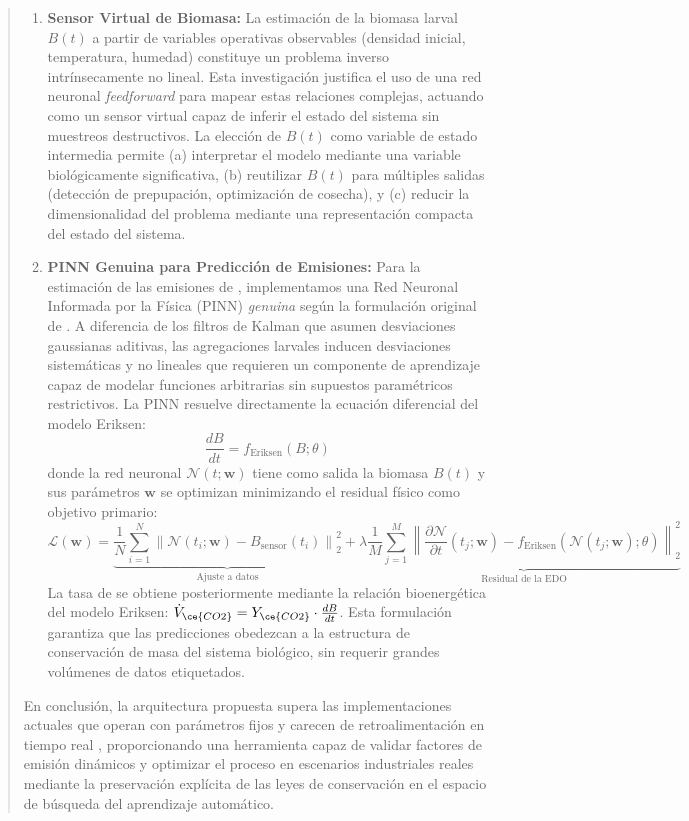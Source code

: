 \documentclass[12pt,oneside]{book}
\begin{document}
\begin{quote}
\begin{enumerate}
    \item \textbf{Sensor Virtual de Biomasa:} La estimación de la biomasa larval $B(t)$ a partir de variables operativas observables (densidad inicial, temperatura, humedad) constituye un problema inverso intrínsecamente no lineal. Esta investigación justifica el uso de una red neuronal \textit{feedforward} para mapear estas relaciones complejas, actuando como un sensor virtual capaz de inferir el estado del sistema sin muestreos destructivos. La elección de $B(t)$ como variable de estado intermedia permite (a) interpretar el modelo mediante una variable biológicamente significativa, (b) reutilizar $B(t)$ para múltiples salidas (detección de prepupación, optimización de cosecha), y (c) reducir la dimensionalidad del problema mediante una representación compacta del estado del sistema.
    
    \item \textbf{PINN Genuina para Predicción de Emisiones:} Para la estimación de las emisiones de , implementamos una Red Neuronal Informada por la Física (PINN) \textit{genuina} según la formulación original de \textcite{raissi2019physics}. A diferencia de los filtros de Kalman que asumen desviaciones gaussianas aditivas, las agregaciones larvales inducen desviaciones sistemáticas y no lineales que requieren un componente de aprendizaje capaz de modelar funciones arbitrarias sin supuestos paramétricos restrictivos. La PINN resuelve directamente la ecuación diferencial del modelo Eriksen:
    \[
    \frac{dB}{dt} = f_{\text{Eriksen}}(B; \theta)
    \]
    donde la red neuronal $\mathcal{N}(t; \mathbf{w})$ tiene como salida la biomasa $B(t)$ y sus parámetros $\mathbf{w}$ se optimizan minimizando el residual físico como objetivo primario:
    \[
    \mathcal{L}(\mathbf{w}) = \underbrace{\frac{1}{N}\sum_{i=1}^{N} \left\| \mathcal{N}(t_i; \mathbf{w}) - B_{\text{sensor}}(t_i) \right\|_2^2}_{\text{Ajuste a datos}} + \lambda \underbrace{\frac{1}{M}\sum_{j=1}^{M} \left\| \frac{\partial \mathcal{N}}{\partial t}(t_j; \mathbf{w}) - f_{\text{Eriksen}}(\mathcal{N}(t_j; \mathbf{w}); \theta) \right\|_2^2}_{\text{Residual de la EDO}}
    \]
    La tasa de  se obtiene posteriormente mediante la relación bioenergética del modelo Eriksen: $\dot{V}_{\ce{CO2}} = Y_{\ce{CO2}} \cdot \frac{dB}{dt}$. Esta formulación garantiza que las predicciones obedezcan a la estructura de conservación de masa del sistema biológico, sin requerir grandes volúmenes de datos etiquetados.
\end{enumerate}

En conclusión, la arquitectura propuesta supera las implementaciones actuales que operan con parámetros fijos y carecen de retroalimentación en tiempo real \parencite{kamilaris2017review,liuOptimizingDataPipelines2023}, proporcionando una herramienta capaz de validar factores de emisión dinámicos y optimizar el proceso en escenarios industriales reales mediante la preservación explícita de las leyes de conservación en el espacio de búsqueda del aprendizaje automático.
\end{quote}
\end{document}

